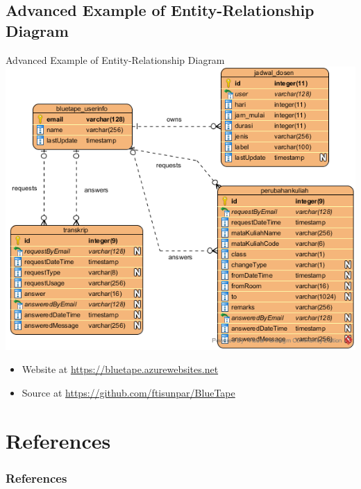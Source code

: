 \documentclass{beamer}
\begin{document}
	\subsection{Advanced Example of Entity-Relationship Diagram}
	\begin{frame}{Advanced Example of Entity-Relationship Diagram}
	\includegraphics[scale=0.4]{img/02_bluetape.png}
    	\begin{itemize}
    	    \item Website at \url{https://bluetape.azurewebsites.net}
    	    \item Source at \url{https://github.com/ftisunpar/BlueTape}
    	\end{itemize}
	\end{frame}	
	
	\section{References}
	\begin{frame}[allowframebreaks]
        \frametitle{References}
        
        
	\end{frame}	
\end{document}
